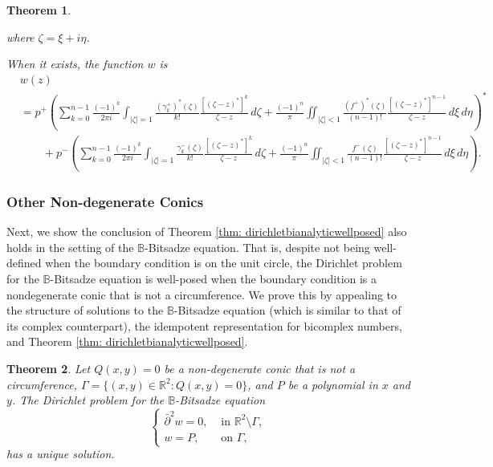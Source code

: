 \documentclass[12pt,reqno]{amsart}
\newtheorem{theorem}{Theorem}[section]
\theoremstyle{definition}
\theoremstyle{remark}
\newcommand{\dbar}{\bar\partial}
\newcommand{\bc}{\mathbb{B}}
\begin{document}
\begin{theorem}
\begin{itemize}
\[                \]
                where $\zeta = \xi + i\eta$.
                \end{itemize}
                When it exists, the function $w$ is
                \begin{align*}
                    &w(z) \\
                    &= p^+\left( \sum_{k=0}^{n-1} \frac{(-1)^k}{2\pi i}\int_{|\zeta|=1} \frac{(\gamma_k^+)^*(\zeta)}{k!} \frac{[(\zeta - z)^*]^k}{\zeta - z}\,d\zeta + \frac{(-1)^n}{\pi} \iint_{|\zeta|<1} \frac{(f^+)^*(\zeta)}{(n-1)!} \frac{[(\zeta -z)^*]^{n-1}}{\zeta - z}\,d\xi\,d\eta\right)^* \\
                    &\quad\quad+ p^- \left( \sum_{k=0}^{n-1} \frac{(-1)^k}{2\pi i}\int_{|\zeta|=1} \frac{\gamma_k^-(\zeta)}{k!} \frac{[(\zeta - z)^*]^k}{\zeta - z}\,d\zeta + \frac{(-1)^n}{\pi} \iint_{|\zeta|<1} \frac{f^-(\zeta)}{(n-1)!} \frac{[(\zeta -z)^*]^{n-1}}{\zeta - z}\,d\xi\,d\eta\right). 
                \end{align*}
            \end{theorem}

            

        \subsubsection{Other Non-degenerate Conics}

            Next, we show the conclusion of Theorem  \ref{thm: dirichletbianalyticwellposed} also holds in the setting of the $\bc$-Bitsadze equation. That is, despite not being well-defined when the boundary condition is on the unit circle, the Dirichlet problem for the $\bc$-Bitsadze equation is well-posed when the boundary condition is a nondegenerate conic that is not a circumference. We prove this by appealing to the structure of solutions to the $\bc$-Bitsadze equation (which is similar to that of its complex counterpart), the idempotent representation for bicomplex numbers, and Theorem \ref{thm: dirichletbianalyticwellposed}. 

            \begin{theorem}\label{thm: generalizationOfBianalyticWellPosed}
             Let $Q(x,y) = 0$ be a non-degenerate conic that is not a circumference, $\Gamma = \{(x,y) \in \mathbb{R}^2 : Q(x,y) = 0\}$, and $P$ be a polynomial in $x$ and $y$. The Dirichlet problem for the $\bc$-Bitsadze equation
                \begin{equation}\label{eq: bicomplexdirichletthm}
                    \begin{cases}
                        \dbar^2 w  = 0, & \text{ in } \mathbb{R}^2\setminus \Gamma,\\
                        w = P, & \text{ on } \Gamma,
                    \end{cases}
                \end{equation}
                has a unique solution.
                \end{theorem}
\end{document}
